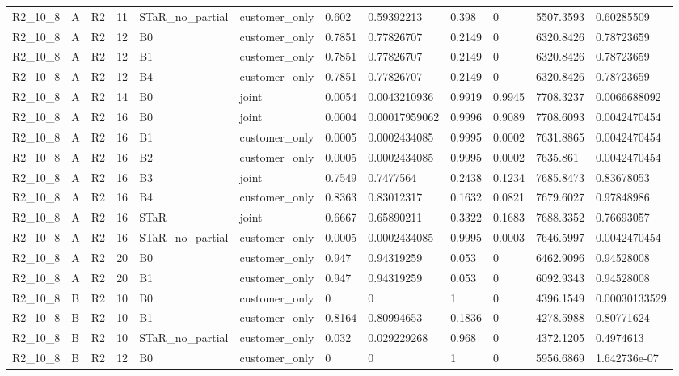 \begin{longtable}{llllllllllll}
R2\_10\_8 & A & R2 & 11 & STaR\_no\_partial & customer\_only & 0.602 & 0.59392213 & 0.398 & 0 & 5507.3593 & 0.60285509 \\
R2\_10\_8 & A & R2 & 12 & B0 & customer\_only & 0.7851 & 0.77826707 & 0.2149 & 0 & 6320.8426 & 0.78723659 \\
R2\_10\_8 & A & R2 & 12 & B1 & customer\_only & 0.7851 & 0.77826707 & 0.2149 & 0 & 6320.8426 & 0.78723659 \\
R2\_10\_8 & A & R2 & 12 & B4 & customer\_only & 0.7851 & 0.77826707 & 0.2149 & 0 & 6320.8426 & 0.78723659 \\
R2\_10\_8 & A & R2 & 14 & B0 & joint & 0.0054 & 0.0043210936 & 0.9919 & 0.9945 & 7708.3237 & 0.0066688092 \\
R2\_10\_8 & A & R2 & 16 & B0 & joint & 0.0004 & 0.00017959062 & 0.9996 & 0.9089 & 7708.6093 & 0.0042470454 \\
R2\_10\_8 & A & R2 & 16 & B1 & customer\_only & 0.0005 & 0.0002434085 & 0.9995 & 0.0002 & 7631.8865 & 0.0042470454 \\
R2\_10\_8 & A & R2 & 16 & B2 & customer\_only & 0.0005 & 0.0002434085 & 0.9995 & 0.0002 & 7635.861 & 0.0042470454 \\
R2\_10\_8 & A & R2 & 16 & B3 & joint & 0.7549 & 0.7477564 & 0.2438 & 0.1234 & 7685.8473 & 0.83678053 \\
R2\_10\_8 & A & R2 & 16 & B4 & customer\_only & 0.8363 & 0.83012317 & 0.1632 & 0.0821 & 7679.6027 & 0.97848986 \\
R2\_10\_8 & A & R2 & 16 & STaR & joint & 0.6667 & 0.65890211 & 0.3322 & 0.1683 & 7688.3352 & 0.76693057 \\
R2\_10\_8 & A & R2 & 16 & STaR\_no\_partial & customer\_only & 0.0005 & 0.0002434085 & 0.9995 & 0.0003 & 7646.5997 & 0.0042470454 \\
R2\_10\_8 & A & R2 & 20 & B0 & customer\_only & 0.947 & 0.94319259 & 0.053 & 0 & 6462.9096 & 0.94528008 \\
R2\_10\_8 & A & R2 & 20 & B1 & customer\_only & 0.947 & 0.94319259 & 0.053 & 0 & 6092.9343 & 0.94528008 \\
R2\_10\_8 & B & R2 & 10 & B0 & customer\_only & 0 & 0 & 1 & 0 & 4396.1549 & 0.00030133529 \\
R2\_10\_8 & B & R2 & 10 & B1 & customer\_only & 0.8164 & 0.80994653 & 0.1836 & 0 & 4278.5988 & 0.80771624 \\
R2\_10\_8 & B & R2 & 10 & STaR\_no\_partial & customer\_only & 0.032 & 0.029229268 & 0.968 & 0 & 4372.1205 & 0.4974613 \\
R2\_10\_8 & B & R2 & 12 & B0 & customer\_only & 0 & 0 & 1 & 0 & 5956.6869 & 1.642736e-07 \\

\end{longtable}

